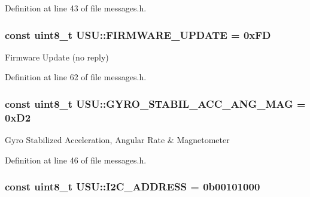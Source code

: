 \-Definition at line 43 of file messages.\-h.

\hypertarget{namespace_u_s_u_a321d286cf60a5fd674ad8c0286db8748}{
\subsubsection[{\-F\-I\-R\-M\-W\-A\-R\-E\-\_\-\-U\-P\-D\-A\-T\-E}]{\setlength{\rightskip}{0pt plus 5cm}const uint8\-\_\-t {\bf \-U\-S\-U\-::\-F\-I\-R\-M\-W\-A\-R\-E\-\_\-\-U\-P\-D\-A\-T\-E} = 0x\-F\-D}}\label{namespace_u_s_u_a321d286cf60a5fd674ad8c0286db8748}
\-Firmware \-Update (no reply) 

\-Definition at line 62 of file messages.\-h.

\hypertarget{namespace_u_s_u_a21b21aa9bf4f65bb8f89f61c853b0d65}{
\subsubsection[{\-G\-Y\-R\-O\-\_\-\-S\-T\-A\-B\-I\-L\-\_\-\-A\-C\-C\-\_\-\-A\-N\-G\-\_\-\-M\-A\-G}]{\setlength{\rightskip}{0pt plus 5cm}const uint8\-\_\-t {\bf \-U\-S\-U\-::\-G\-Y\-R\-O\-\_\-\-S\-T\-A\-B\-I\-L\-\_\-\-A\-C\-C\-\_\-\-A\-N\-G\-\_\-\-M\-A\-G} = 0x\-D2}}\label{namespace_u_s_u_a21b21aa9bf4f65bb8f89f61c853b0d65}
\-Gyro \-Stabilized \-Acceleration, \-Angular \-Rate \& \-Magnetometer 

\-Definition at line 46 of file messages.\-h.

\hypertarget{namespace_u_s_u_a2db9a5d5bfe7ac01ad7614d2113cdbee}{
\subsubsection[{\-I2\-C\-\_\-\-A\-D\-D\-R\-E\-S\-S}]{\setlength{\rightskip}{0pt plus 5cm}const uint8\-\_\-t {\bf \-U\-S\-U\-::\-I2\-C\-\_\-\-A\-D\-D\-R\-E\-S\-S} = 0b00101000}}\label{namespace_u_s_u_a2db9a5d5bfe7ac01ad7614d2113cdbee}


